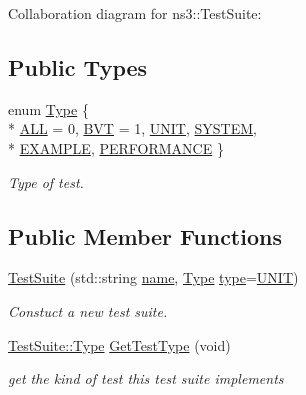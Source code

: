 Collaboration diagram for ns3\+:\+:Test\+Suite\+:
\subsection*{Public Types}
\begin{DoxyCompactItemize}
\item 
enum \hyperlink{classns3_1_1TestSuite_a1ebfcab34ec8161e085e8e3a1855eae0}{Type} \{ \\*
\hyperlink{classns3_1_1TestSuite_a1ebfcab34ec8161e085e8e3a1855eae0ad8b114e201710e2d7d6b9d39564f585a}{A\+LL} = 0, 
\hyperlink{classns3_1_1TestSuite_a1ebfcab34ec8161e085e8e3a1855eae0a63b3cc3850b48eba5909e975232a4efc}{B\+VT} = 1, 
\hyperlink{classns3_1_1TestSuite_a1ebfcab34ec8161e085e8e3a1855eae0a3885375a3787abf60431f8454b3cadbd}{U\+N\+IT}, 
\hyperlink{classns3_1_1TestSuite_a1ebfcab34ec8161e085e8e3a1855eae0a90c5529a26ab3a5ffcc6e57040dbd82e}{S\+Y\+S\+T\+EM}, 
\\*
\hyperlink{classns3_1_1TestSuite_a1ebfcab34ec8161e085e8e3a1855eae0a00fd09245de411aef0a7a4e42b858df2}{E\+X\+A\+M\+P\+LE}, 
\hyperlink{classns3_1_1TestSuite_a1ebfcab34ec8161e085e8e3a1855eae0a0d439cead7625e5ab851a783a72ada84}{P\+E\+R\+F\+O\+R\+M\+A\+N\+CE}
 \}\begin{DoxyCompactList}\small\item\em Type of test. \end{DoxyCompactList}
\end{DoxyCompactItemize}
\subsection*{Public Member Functions}
\begin{DoxyCompactItemize}
\item 
\hyperlink{classns3_1_1TestSuite_a904b0c40583b744d30908aeb94636d1a}{Test\+Suite} (std\+::string \hyperlink{generate__test__data__lte__spectrum__model_8m_ab74e6bf80237ddc4109968cedc58c151}{name}, \hyperlink{classns3_1_1TestSuite_a1ebfcab34ec8161e085e8e3a1855eae0}{Type} \hyperlink{visualizer-ideas_8txt_add98db9e15e2a58cf2b57623e7aa893a}{type}=\hyperlink{classns3_1_1TestSuite_a1ebfcab34ec8161e085e8e3a1855eae0a3885375a3787abf60431f8454b3cadbd}{U\+N\+IT})
\begin{DoxyCompactList}\small\item\em Constuct a new test suite. \end{DoxyCompactList}\item 
\hyperlink{classns3_1_1TestSuite_a1ebfcab34ec8161e085e8e3a1855eae0}{Test\+Suite\+::\+Type} \hyperlink{classns3_1_1TestSuite_aa495cb60c8fb762b7f73158865dde19c}{Get\+Test\+Type} (void)
\begin{DoxyCompactList}\small\item\em get the kind of test this test suite implements \end{DoxyCompactList}\end{DoxyCompactItemize}
